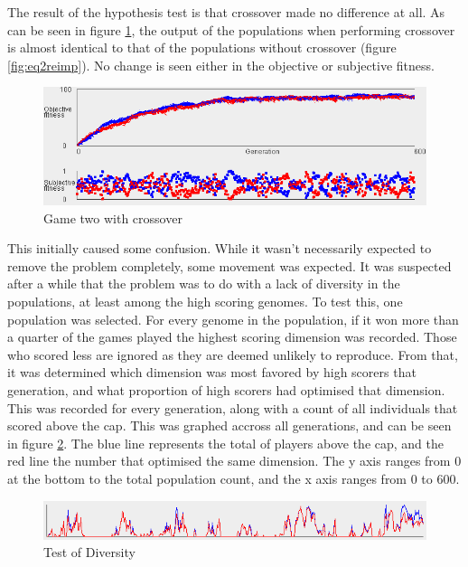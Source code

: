 \documentclass{article}
\begin{document}
The result of the hypothesis test is that crossover made no difference at all. As can be seen in figure \ref{fig:extend}, the output of the populations when performing crossover is almost identical to that of the populations without crossover (figure \ref{fig:eq2reimp}). No change is seen either in the objective or subjective fitness.
\begin{figure}
  \centering
  \includegraphics[width=.6\linewidth]{Screencaps/crossover}
  \caption{Game two with crossover}
  \label{fig:extend}
\end{figure}

This initially caused some confusion. While it wasn't necessarily expected to remove the problem completely, some movement was expected. It was suspected after a while that the problem was to do with a lack of diversity in the populations, at least among the high scoring genomes. To test this, one population was selected. For every genome in the population, if it won more than a quarter of the games played the highest scoring dimension was recorded. Those who scored less are ignored as they are deemed unlikely to reproduce. From that, it was determined which dimension was most favored by high scorers that generation, and what proportion of high scorers had optimised that dimension. This was recorded for every generation, along with a count of all individuals that scored above the cap. This was graphed accross all generations, and can be seen in figure \ref{fig:diversity}. The blue line represents the total of players above the cap, and the red line the number that optimised the same dimension. The y axis ranges from 0 at the bottom to the total population count, and the x axis ranges from 0 to 600. 

\begin{figure}
  \centering
  \includegraphics[width=.6\linewidth]{Screencaps/diversity}
  \caption{Test of Diversity}
  \label{fig:diversity}
\end{figure}
\end{document}
